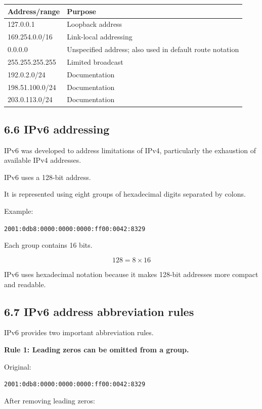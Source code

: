 \begin{table}[htbp]
\centering
\begin{tabularx}{\textwidth}{p{3.9cm} X}
\toprule
\textbf{Address/range} & \textbf{Purpose} \\
\midrule
127.0.0.1 & Loopback address \\
169.254.0.0/16 & Link-local addressing \\
0.0.0.0 & Unspecified address; also used in default route notation \\
255.255.255.255 & Limited broadcast \\
192.0.2.0/24 & Documentation \\
198.51.100.0/24 & Documentation \\
203.0.113.0/24 & Documentation \\
\bottomrule
\end{tabularx}
\end{table}

\subsection{6.6 IPv6 addressing}

IPv6 was developed to address limitations of IPv4, particularly the exhaustion of available IPv4 addresses.

IPv6 uses a 128-bit address.

It is represented using eight groups of hexadecimal digits separated by colons.

Example:

\texttt{2001:0db8:0000:0000:0000:ff00:0042:8329}

Each group contains 16 bits.


\[
128=8\times16
\]


IPv6 uses hexadecimal notation because it makes 128-bit addresses more compact and readable.

\subsection{6.7 IPv6 address abbreviation rules}

IPv6 provides two important abbreviation rules.

\textbf{Rule 1: Leading zeros can be omitted from a group.}

Original:

\texttt{2001:0db8:0000:0000:0000:ff00:0042:8329}

After removing leading zeros:

